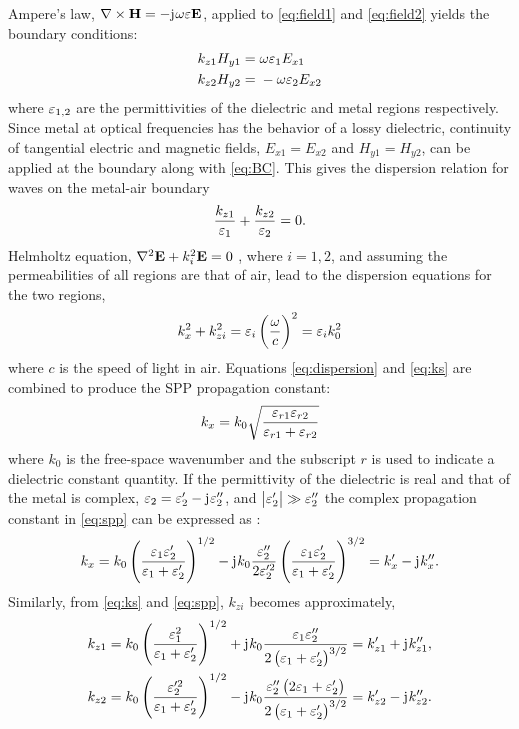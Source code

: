 \documentclass[11pt]{article}
\begin{document}
Ampere's law, $ \nabla\times{\mathbf{H}} = -\mathrm{j}\mkern1mu \omega \varepsilon \mathbf{E}$, applied to \eqref{eq:field1} and \eqref{eq:field2} yields the boundary conditions:
%
\begin{subequations}
  \begin{align}
    k_{z1} H_{y1} ={}& \omega \varepsilon_1 E_{x1}
    \label{eq:bc1} \\
    k_{z2} H_{y2} ={}& -\omega \varepsilon_2 E_{x2}
    \label{eq:bc2}
  \end{align}
  \label{eq:BC}
\end{subequations}
%
where $\varepsilon_{1,2}$ are the permittivities of the dielectric and metal regions respectively. Since metal at optical frequencies has the behavior of a lossy dielectric, continuity of tangential electric and magnetic fields, $E_{x1} = E_{x2}$ and $H_{y1} = H_{y2}$, can be applied at the boundary along with \eqref{eq:BC}. This gives the dispersion relation for waves on the metal-air boundary
%
\begin{equation}
  \frac{k_{z1}}{\varepsilon_1} + \frac{k_{z2}}{\varepsilon_2} = 0.
  \label{eq:dispersion}
\end{equation}
%
Helmholtz equation, $\nabla^2 \mathbf{E} + k_i^2 \mathbf{E} = 0$ , where $i = 1,2$, and assuming the permeabilities of all regions are that of air, lead to the dispersion equations for the two regions,
%
\begin{equation}
  k_x^2 + k_{zi}^2 = \varepsilon_i \left( \frac{\omega}{c} \right)^2 = \varepsilon_i k_0^2
  \label{eq:ks}
\end{equation}
%
where $c$ is the speed of light in air. Equations \eqref{eq:dispersion} and \eqref{eq:ks} are combined to produce the SPP propagation constant:
%
\begin{equation}
  k_x = k_0 \sqrt{\frac{\varepsilon_{r1} \varepsilon_{r2}}{\varepsilon_{r1} + \varepsilon_{r2}}}
  \label{eq:spp}
\end{equation}
%
where $k_0$ is the free-space wavenumber and the subscript $r$ is used to indicate a dielectric constant quantity. If the permittivity of the dielectric is real and that of the metal is complex, $\varepsilon_2 = \varepsilon_2' - \mathrm{j}\mkern1mu \varepsilon_2''$, and $\left|\varepsilon_2' \right| \gg \varepsilon_2''$  the complex propagation constant in \eqref{eq:spp} can be expressed as \cite{Raether1988}:
%
\begin{equation}
  k_x = k_0 \left( \frac{\varepsilon_1 \varepsilon_2'}{\varepsilon_1 + \varepsilon_2'} \right)^{1/2} - \mathrm{j}\mkern1mu k_0 \frac{\varepsilon_2''}{2 \varepsilon_2'^2} \left( \frac{ \varepsilon_1 \varepsilon_2'}{\varepsilon_1 + \varepsilon_2'} \right)^{3/2} = k_x' - \mathrm{j}\mkern1mu k_x''.
  \label{eq:complec_kx}
\end{equation}
%
Similarly, from \eqref{eq:ks} and \eqref{eq:spp}, $k_{zi}$ becomes approximately,
%
\begin{subequations}
  \begin{align}
    k_{z1} = k_0 \left( \frac{\varepsilon_1^2}{\varepsilon_1 + \varepsilon_2'} \right)^{1/2} + \mathrm{j}\mkern1mu k_0  \frac{ \varepsilon_1 \varepsilon_2''}{2 \left( \varepsilon_1 + \varepsilon_2' \right)^{3/2}} = k_{z1}' + \mathrm{j}\mkern1mu k_{z1}'',
    \label{eq:kz1} \\
    k_{z2} = k_0 \left( \frac{\varepsilon_2'^2}{\varepsilon_1 + \varepsilon_2'} \right)^{1/2} - \mathrm{j}\mkern1mu k_0  \frac{\varepsilon_2''\left( 2\varepsilon_1 + \varepsilon_2' \right) }{2 \left( \varepsilon_1 + \varepsilon_2' \right)^{3/2}} = k_{z2}' - \mathrm{j}\mkern1mu k_{z2}''.
    \label{eq:kz2}
  \end{align}
  \label{eq:kz}
\end{subequations}
\end{document}
